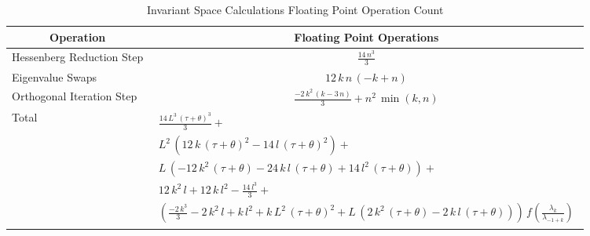 \begin{table*}[htbp]
  \begin{center}
    \leavevmode
    \begin{tabular}{|l|c|}
\hline
\multicolumn{1}{|c|}{Operation}&
\multicolumn{1}{|c|}{Floating Point Operations}\\
\hline
Hessenberg Reduction Step&${\frac{14\,{n^3}}{3}}$\\
\hline
Eigenvalue Swaps&$12\,k\,n\,\left( -k + n \right) $\\
\hline
Orthogonal Iteration Step&${\frac{-2\,{k^2}\,\left( k - 3\,n \right) }{3}} + {n^2}\,\min (k,n)$\\
\hline
Total&
\multicolumn{1}{|p{4.0in}|}{{\tiny
    \begin{multline*}%
{\frac{14\,{L^3}\,{{\left( \tau + \theta \right) }^3}}{3}}+\\
{L^2}\,\left( 12\,k\,{{\left( \tau + \theta \right) }^2} - 
    14\,l\,{{\left( \tau + \theta \right) }^2} \right) +\\
L\,\left( -12\,{k^2}\,\left( \tau + \theta \right)  - 
    24\,k\,l\,\left( \tau + \theta \right)  + 
    14\,{l^2}\,\left( \tau + \theta \right)  \right) +\\
12\,{k^2}\,l + 12\,k\,{l^2} - {\frac{14\,{l^3}}{3}} +\\
\left( {\frac{-2\,{k^3}}{3}} - 2\,{k^2}\,l + k\,{l^2} + 
    k\,{L^2}\,{{\left( \tau + \theta \right) }^2} + 
    L\,\left( 2\,{k^2}\,\left( \tau + \theta \right)  - 
       2\,k\,l\,\left( \tau + \theta \right)  \right)  \right) \,
  f({\frac{{{\lambda}_k}}{{{\lambda}_{-1 + k}}}})
\end{multline*}}
}\\
\hline
    \end{tabular}
    \caption{Invariant Space Calculations Floating Point Operation Count}
    \label{tab:ESCount}
  \end{center}
\end{table*}
